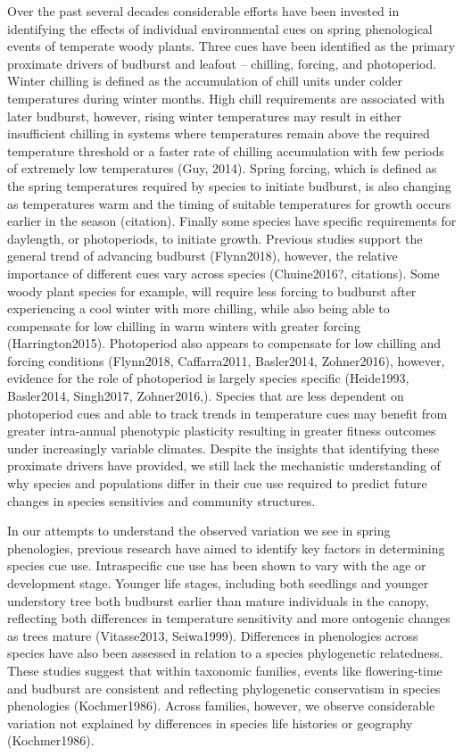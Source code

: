 \documentclass{article}\usepackage[]{graphicx}\usepackage[]{color}
\begin{document}
Over the past several decades considerable efforts have been invested in identifying the effects of individual environmental cues on spring phenological events of temperate woody plants. Three cues have been identified as the primary proximate drivers of budburst and leafout -- chilling, forcing, and photoperiod. Winter chilling is defined as the accumulation of chill units under colder temperatures during winter months. High chill requirements are associated with later budburst, however, rising winter temperatures may result in either insufficient chilling in systems where temperatures remain above the required temperature threshold or a faster rate of chilling accumulation with few periods of extremely low temperatures (Guy, 2014). Spring forcing, which is defined as the spring temperatures required by species to initiate budburst, is also changing as temperatures warm and the timing of suitable temperatures for growth occurs earlier in the season (citation). Finally some species have specific requirements for daylength, or photoperiods, to initiate growth. Previous studies support the general trend of advancing budburst (Flynn2018), however, the relative importance of different cues vary across species (Chuine2016?, citations). Some woody plant species for example, will require less forcing to budburst after experiencing a cool winter with more chilling, while also being able to compensate for low chilling in warm winters with greater forcing (Harrington2015). Photoperiod also appears to compensate for low chilling and forcing conditions (Flynn2018,  Caffarra2011, Basler2014,  Zohner2016), however, evidence for the role of photoperiod is largely species specific (Heide1993, Basler2014, Singh2017, Zohner2016,). Species that are less dependent on photoperiod cues and able to track trends in temperature cues may benefit from greater intra-annual phenotypic plasticity resulting in greater fitness outcomes under increasingly variable climates. Despite the insights that identifying these proximate drivers have provided, we still lack the mechanistic understanding of why species and populations differ in their cue use required to predict future changes in species sensitivies and community structures.

In our attempts to understand the observed variation we see in spring phenologies, previous research have aimed to identify key factors in determining species cue use. Intraspecific cue use has been shown to vary with the age or development stage. Younger life stages, including both seedlings and younger understory tree both budburst earlier than mature individuals in the canopy, reflecting both differences in temperature sensitivity and more ontogenic changes as trees mature (Vitasse2013, Seiwa1999). Differences in phenologies across species have also been assessed in relation to a species phylogenetic relatedness. These studies suggest that within taxonomic families, events like flowering-time and budburst are consistent and reflecting phylogenetic conservatism in species phenologies (Kochmer1986). Across families, however, we observe considerable variation not explained by differences in species life histories or geography (Kochmer1986).
\end{document}

